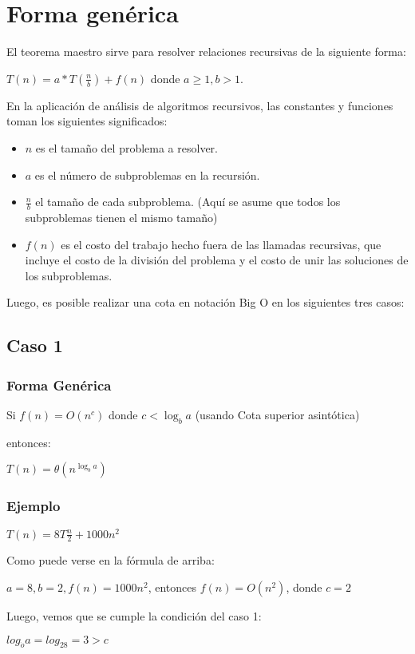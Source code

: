 \documentclass[12pt]{article} %
\begin{document}
\section{Forma genérica}
El teorema maestro sirve para resolver relaciones recursivas de la siguiente forma:

$T(n) = a*T (\frac{n}{b}) + f(n)$  donde  $ a\geq1, b>1$. 

En la aplicación de análisis de algoritmos recursivos, las constantes y funciones toman los siguientes significados:

\begin{itemize}
    \item $n$ es el tamaño del problema a resolver.
    \item $a$ es el número de subproblemas en la recursión.
    \item $\frac{n}{b}$ el tamaño de cada subproblema. (Aquí se asume que todos los subproblemas tienen el mismo tamaño)
    \item $f(n)$ es el costo del trabajo hecho fuera de las llamadas recursivas, que incluye el costo de la división del problema y el costo de unir las soluciones de los subproblemas.
\end{itemize}
Luego, es posible realizar una cota en notación Big O en los siguientes tres casos:

\subsection{Caso 1}
\subsubsection{Forma Genérica}
Si $f(n)=O(n^{c})$ donde $c<\log_b{a}$ (usando Cota superior asintótica)

entonces:

$T(n)=\theta (n^{\log_b{a}})$

\subsubsection{Ejemplo}
$T(n)=8T \frac{n}{2} + 1000 n^{2}$

Como puede verse en la fórmula de arriba:

$a=8, b=2, f(n)=1000 n^{2}$, entonces $ f(n)=O(n^{2})$, donde $c=2$

Luego, vemos que se cumple la condición del caso 1:

$log_{\dot{o}}{a} = log_28 = 3 > c$
\end{document}
